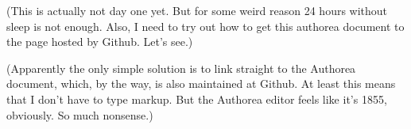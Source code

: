 
(This is actually not day one yet. But for some weird reason 24 hours without sleep is not enough. Also, I need to try out how to get this authorea document to the page hosted by Github. Let's see.)

(Apparently the only simple solution is to link straight to the Authorea document, which, by the way, is also maintained at Github. At least this means that I don't have to type markup. But the Authorea editor feels like it's 1855, obviously. So much nonsense.)